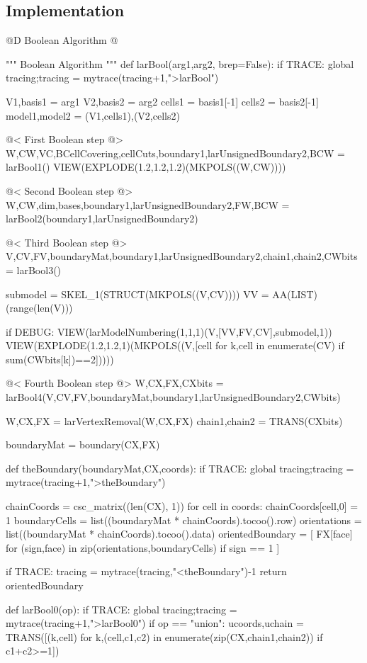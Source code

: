 \documentclass[11pt,oneside]{article}	%
\begin{document}
\subsection{Implementation}


@D Boolean Algorithm
@{""" Boolean Algorithm """
def larBool(arg1,arg2, brep=False):
	if TRACE: global tracing;tracing = mytrace(tracing+1,">larBool")

	V1,basis1 = arg1
	V2,basis2 = arg2
	cells1 = basis1[-1]
	cells2 = basis2[-1]
	model1,model2 = (V1,cells1),(V2,cells2)
		
	@< First Boolean step @>
	W,CW,VC,BCellCovering,cellCuts,boundary1,larUnsignedBoundary2,BCW = larBool1()
	VIEW(EXPLODE(1.2,1.2,1.2)(MKPOLS((W,CW))))
	
	@< Second Boolean step @>
	W,CW,dim,bases,boundary1,larUnsignedBoundary2,FW,BCW = larBool2(boundary1,larUnsignedBoundary2)

	@< Third Boolean step @>
	V,CV,FV,boundaryMat,boundary1,larUnsignedBoundary2,chain1,chain2,CWbits = larBool3()
	
	submodel = SKEL_1(STRUCT(MKPOLS((V,CV))))
	VV = AA(LIST)(range(len(V)))
	
	if DEBUG:
		VIEW(larModelNumbering(1,1,1)(V,[VV,FV,CV],submodel,1))
		VIEW(EXPLODE(1.2,1.2,1)(MKPOLS((V,[cell for k,cell in enumerate(CV) if sum(CWbits[k])==2]))))
	
	@< Fourth Boolean step @>
	W,CX,FX,CXbits = larBool4(V,CV,FV,boundaryMat,boundary1,larUnsignedBoundary2,CWbits)

	W,CX,FX = larVertexRemoval(W,CX,FX)
	chain1,chain2 = TRANS(CXbits)
	
	boundaryMat = boundary(CX,FX)

	def theBoundary(boundaryMat,CX,coords):
		if TRACE: global tracing;tracing = mytrace(tracing+1,">theBoundary")

		chainCoords = csc_matrix((len(CX), 1))
		for cell in coords: chainCoords[cell,0] = 1
		boundaryCells = list((boundaryMat * chainCoords).tocoo().row)
		orientations = list((boundaryMat * chainCoords).tocoo().data)
		orientedBoundary = [ FX[face] for (sign,face) in zip(orientations,boundaryCells)  if sign == 1 ]

		if TRACE: tracing = mytrace(tracing,"<theBoundary")-1
		return orientedBoundary


	def larBool0(op):
		if TRACE: global tracing;tracing = mytrace(tracing+1,">larBool0")
		if op == "union": 
			ucoords,uchain = TRANS([(k,cell) for k,(cell,c1,c2) in enumerate(zip(CX,chain1,chain2)) if c1+c2>=1])

}
\end{document}
